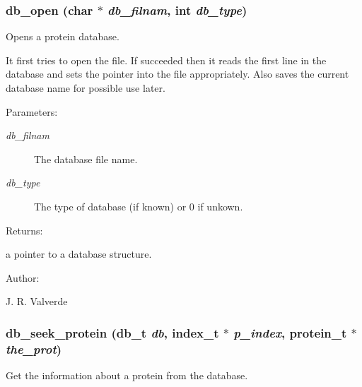 \subsubsection{ db\_\-open (char $\ast$ {\em db\_\-filnam}, int {\em db\_\-type})}\label{P__db_8h_a1}


Opens a protein database.



 It first tries to open the file. If succeeded then it reads the first line in the database and sets the pointer into the file appropriately. Also saves the current database name for possible use later.\begin{Desc}
\item[Parameters: ]\par
\begin{description}
\item[{\em 
db\_\-filnam}]The database file name. \item[{\em 
db\_\-type}]The type of database (if known) or 0 if unkown.\end{description}
\end{Desc}
\begin{Desc}
\item[Returns: ]\par
a pointer to a database structure.\end{Desc}
\begin{Desc}
\item[Author: ]\par
J. R. Valverde \end{Desc}
\subsubsection{ db\_\-seek\_\-protein ({\bf db\_\-t} {\em db}, {\bf index\_\-t} $\ast$ {\em p\_\-index}, {\bf protein\_\-t} $\ast$ {\em the\_\-prot})}\label{P__db_8h_a3}


Get the information about a protein from the database.



